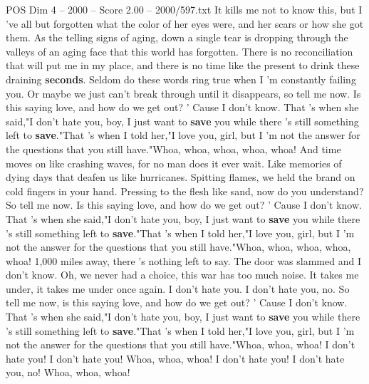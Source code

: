 \begin{textsample}{POS Dim 4 – 2000 – Score 2.00 – 2000/597.txt}  \label{ex:f4_pos_015}
It kills me not to know this, but I 've all but forgotten what the color of her eyes were, and her scars or how she got them.
As the telling signs of aging, down a single tear is dropping through the valleys of an aging face that this world has forgotten.
There is no reconciliation that will put me in my place, and there is no time like the present to drink these draining \textbf{seconds}.
Seldom do these words ring true when I 'm constantly failing you.
Or maybe we just can't break through until it disappears, so tell me now.
Is this saying love, and how do we get out? ' Cause I don't know.
That 's when she said,"I don't hate you, boy, I just want to \textbf{save} you while there 's still something left to \textbf{save}."That 's when I told her,"I love you, girl, but I 'm not the answer for the questions that you still have."Whoa, whoa, whoa, whoa, whoa!
And time moves on like crashing waves, for no man does it ever wait.
Like memories of dying days that deafen us like hurricanes.
Spitting flames, we held the brand on cold fingers in your hand.
Pressing to the flesh like sand, now do you understand?
So tell me now.
Is this saying love, and how do we get out? ' Cause I don't know.
That 's when she said,"I don't hate you, boy, I just want to \textbf{save} you while there 's still something left to \textbf{save}."That 's when I told her,"I love you, girl, but I 'm not the answer for the questions that you still have."Whoa, whoa, whoa, whoa, whoa! 1,000 miles away, there 's nothing left to say.
The door was slammed and I don't know.
Oh, we never had a choice, this war has too much noise.
It takes me under, it takes me under once again.
I don't hate you.
I don't hate you, no.
So tell me now, is this saying love, and how do we get out? ' Cause I don't know.
That 's when she said,"I don't hate you, boy, I just want to \textbf{save} you while there 's still something left to \textbf{save}."That 's when I told her,"I love you, girl, but I 'm not the answer for the questions that you still have."Whoa, whoa, whoa!
I don't hate you!
I don't hate you!
Whoa, whoa, whoa!
I don't hate you!
I don't hate you, no!
Whoa, whoa, whoa!

\end{textsample}
